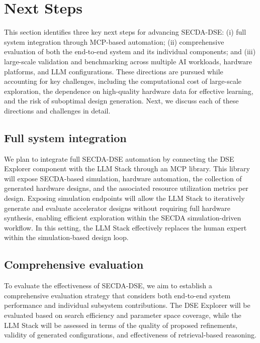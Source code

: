 
\section{Next Steps}
\label{Discussions}

This section identifies three key next steps for advancing SECDA-DSE: (i) full system integration through MCP-based automation; (ii) comprehensive evaluation of both the end-to-end system and its individual components; and (iii) large-scale validation and benchmarking across multiple AI workloads, hardware platforms, and LLM configurations. 
These directions are pursued while accounting for key challenges, including the computational cost of large-scale exploration, the dependence on high-quality hardware data for effective learning, and the risk of suboptimal design generation. Next, we discuss each of these directions and challenges in detail.


\subsection{Full system integration} 

We plan to integrate full SECDA-DSE automation by connecting the DSE Explorer component with the LLM Stack through an MCP library. This library will expose SECDA-based simulation, hardware automation, the collection of generated hardware designs, and the associated resource utilization metrics per design. 
Exposing simulation endpoints will allow the LLM Stack to iteratively generate and evaluate accelerator designs without requiring full hardware synthesis, enabling efficient exploration within the SECDA simulation-driven workflow. In this setting, the LLM Stack effectively replaces the human expert within the simulation-based design loop. 



\subsection{Comprehensive evaluation} 

To evaluate the effectiveness of SECDA-DSE, we aim to establish a comprehensive evaluation strategy that considers both end-to-end system performance and individual subsystem contributions. 
The DSE Explorer will be evaluated based on search efficiency and parameter space coverage, while the LLM Stack will be assessed in terms of the quality of proposed refinements, validity of generated configurations, and effectiveness of retrieval-based reasoning. 

